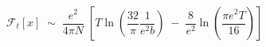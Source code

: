 \begin{equation}\label{eq:ft2}
{\mathcal F}_t[x]\;\sim\; \frac{e^2}{4 \pi N} \; 
\left[ 
T \ln( \frac{32}{\pi} \frac{1}{e^2 b} ) \;-\; \frac{8}{e^2} 
\ln (\frac{\pi e^2 T}{16}) \right]
\end{equation}

